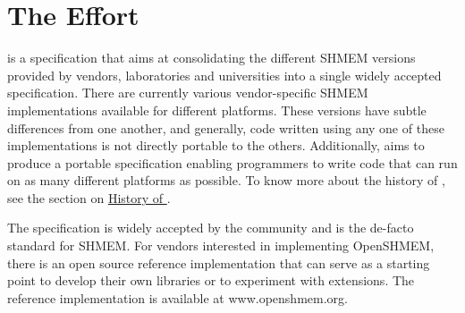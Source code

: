 
\section{The \openshmem Effort}

\openshmem is a specification that aims at consolidating the different
SHMEM versions provided by vendors, laboratories and universities 
into a single widely accepted specification. There are currently various vendor-specific SHMEM implementations available for
different platforms. These versions have subtle differences from one
another, and generally, code written using any one of these
implementations is not directly portable to the others. Additionally, \openshmem aims
to produce a portable specification enabling programmers to write
\openshmem code that can run on as many different platforms
as possible. To know more about the history of \openshmem, see the section on \hyperref[sec:openshmem_history]{History of \openshmem}.

The \openshmem specification is widely accepted by the community and is the de-facto
standard for SHMEM.  For vendors interested in implementing OpenSHMEM, there is an open source reference implementation
that can serve as a starting point to develop their own libraries or to experiment with extensions. The reference implementation is available at www.openshmem.org.
